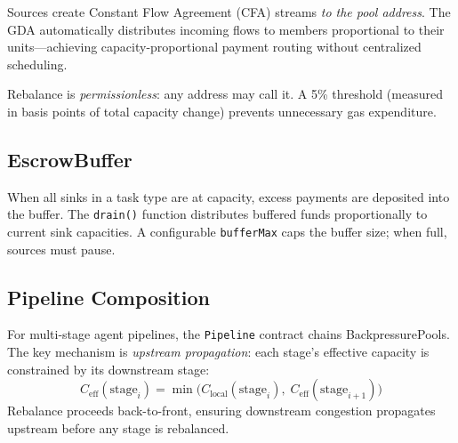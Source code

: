 Sources create Constant Flow Agreement (CFA) streams \emph{to the pool address}.
The GDA automatically distributes incoming flows to members proportional to their
units---achieving capacity-proportional payment routing without centralized scheduling.

Rebalance is \emph{permissionless}: any address may call it. A 5\% threshold
(measured in basis points of total capacity change) prevents unnecessary gas
expenditure.

\subsection{EscrowBuffer}

When all sinks in a task type are at capacity, excess payments are deposited
into the buffer. The \texttt{drain()} function distributes buffered funds
proportionally to current sink capacities. A configurable \texttt{bufferMax}
caps the buffer size; when full, sources must pause.

\subsection{Pipeline Composition}

For multi-stage agent pipelines, the \texttt{Pipeline} contract chains
BackpressurePools. The key mechanism is \emph{upstream propagation}:
each stage's effective capacity is constrained by its downstream stage:
\begin{equation}
C_{\text{eff}}(\text{stage}_i) = \min\bigl(C_{\text{local}}(\text{stage}_i),\;
C_{\text{eff}}(\text{stage}_{i+1})\bigr)
\end{equation}
Rebalance proceeds back-to-front, ensuring downstream congestion propagates
upstream before any stage is rebalanced.
